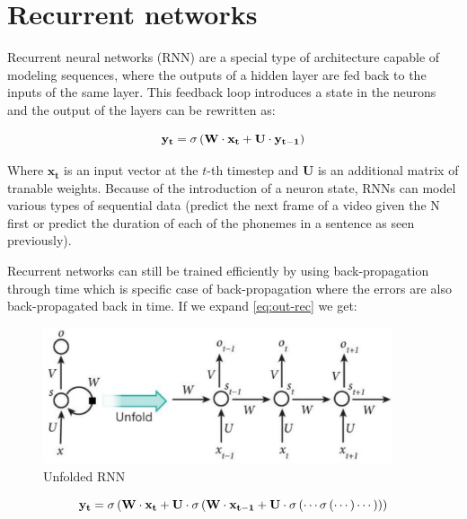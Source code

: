 \section{Recurrent networks}

Recurrent neural networks (RNN) are a special type of architecture capable of modeling sequences, where the outputs of a hidden layer are fed back to the inputs of the same layer. This feedback loop introduces a state in the neurons and the output of the layers can be rewritten as:

\begin{equation}
    \centering
    \mathbf{y_t} = \sigma \left ( \mathbf{W} \cdot \mathbf{x_t} + \mathbf{U} \cdot \mathbf{y_{t-1}} \right )
    \label{eq:out-rec}
\end{equation}

Where $\mathbf{x_t}$ is an input vector at the $t$-th timestep and $\mathbf{U}$ is an additional matrix of tranable weights. Because of the introduction of a neuron state, RNNs can model various types of sequential data (predict the next frame of a video given the N first or predict the duration of each of the phonemes in a sentence as seen previously).

Recurrent networks can still be trained efficiently by using back-propagation through time \cite{werbos1990backpropagation} which is specific case of back-propagation where the errors are also back-propagated back in time. If we expand \eqref{eq:out-rec} we get:

\begin{figure}
    \centering
    \includegraphics[height=4cm]{figures/unfold}
    \caption{Unfolded RNN}
    \label{fig:unfold}
\end{figure}

\begin{equation}
    \centering
    \mathbf{y_t} = \sigma \left ( \mathbf{W} \cdot \mathbf{x_t} + \mathbf{U} \cdot \sigma \left ( \mathbf{W} \cdot \mathbf{x_{t-1}} + \mathbf{U} \cdot \sigma \left ( \cdots \sigma \left ( \cdots \right ) \cdots \right ) \right ) \right )
    \label{eq:out-rec-expanded}
\end{equation}

